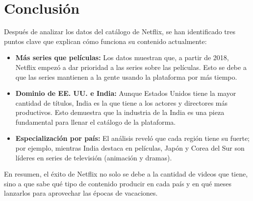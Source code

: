 \documentclass[12pt]{article}
\begin{document}
\section{Conclusión}

Después de analizar los datos del catálogo de Netflix, se han identificado tres puntos clave que explican cómo funciona su contenido actualmente:

\begin{itemize}
    \item \textbf{Más series que películas:} Los datos muestran que, a partir de 2018, Netflix empezó a dar prioridad a las series sobre las películas. Esto se debe a que las series mantienen a la gente usando la plataforma por más tiempo.
    \item \textbf{Dominio de EE. UU. e India:} Aunque Estados Unidos tiene la mayor cantidad de títulos, India es la que tiene a los actores y directores más productivos. Esto demuestra que la industria de la India es una pieza fundamental para llenar el catálogo de la plataforma.
    \item \textbf{Especialización por país:} El análisis reveló que cada región tiene su fuerte; por ejemplo, mientras India destaca en películas, Japón y Corea del Sur son líderes en series de televisión (animación y dramas).
\end{itemize}

En resumen, el éxito de Netflix no solo se debe a la cantidad de videos que tiene, sino a que sabe qué tipo de contenido producir en cada país y en qué meses lanzarlos para aprovechar las épocas de vacaciones.
\printbibliography[title={Referencias bibliográficas}]
\end{document}
